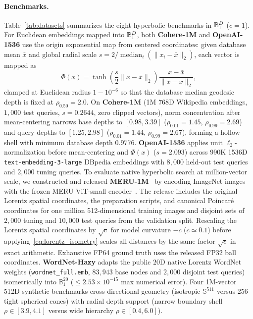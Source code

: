 \paragraph{Benchmarks.}
Table~\ref{tab:datasets} summarizes the eight hyperbolic benchmarks in $\mathbb{B}_1^D$ ($c=1$).
For Euclidean embeddings mapped into $\mathbb{B}_1^D$, both \textbf{Cohere-1M} and \textbf{OpenAI-1536} use the origin exponential map from centered coordinates: given database mean $\bar{x}$ and global radial scale $s = 2 / \operatorname{median}_i(\|x_i - \bar{x}\|_2)$, each vector is mapped as
\[
\Phi(x) = \tanh\!\left(\frac{s}{2}\|x - \bar{x}\|_2\right)\frac{x - \bar{x}}{\|x - \bar{x}\|_2},
\]
clamped at Euclidean radius $1 - 10^{-6}$ so that the database median geodesic depth is fixed at $\rho_{0.50} = 2.0$.
On \textbf{Cohere-1M} (1M 768D Wikipedia embeddings, $1{,}000$ test queries, $s = 0.2644$, zero clipped vectors), norm concentration after mean-centering narrows base depths to $[0.98, 3.39]$ ($\rho_{0.01} = 1.45$, $\rho_{0.99} = 2.69$) and query depths to $[1.25, 2.98]$ ($\rho_{0.01} = 1.44$, $\rho_{0.99} = 2.67$), forming a hollow shell with minimum database depth $0.9776$.
\textbf{OpenAI-1536} applies unit $\ell_2$-normalization before mean-centering and $\Phi(x)$ ($s = 2.093$) across 990K 1536D \texttt{text-embedding-3-large} {DBpedia} embeddings with $8{,}000$ held-out test queries and $2{,}000$ tuning queries.
To evaluate native hyperbolic search at million-vector scale, we constructed and released \textbf{MERU-1M}~\cite{astrmira2026meruimagenet1m} by encoding {ImageNet} images with the frozen {MERU ViT-small} encoder~\cite{desai2023meru}.
The release includes the original Lorentz spatial coordinates, the preparation scripts, and canonical Poincar\'e coordinates for one million 512-dimensional training images and disjoint sets of $2{,}000$ tuning and $10{,}000$ test queries from the validation split. Rescaling the Lorentz spatial coordinates by $\sqrt{c}$ for model curvature $-c$ ($c\simeq0.1$) before applying~\eqref{eq:lorentz_isometry} scales all distances by the same factor $\sqrt{c}$ in exact arithmetic. Exhaustive FP64 ground truth uses the released FP32 ball coordinates.
\textbf{WordNet-Hazy} adapts the public $20$D native {Lorentz} {WordNet} weights (\texttt{wordnet\_full.emb}, $83{,}943$ base nodes and $2{,}000$ disjoint test queries) isometrically into $\mathbb{B}_1^{20}$ ($\le 2.53\times 10^{-15}$ max numerical error).
Four 1M-vector 512D synthetic benchmarks cross directional geometry (isotropic $\mathbb{S}^{511}$ versus $256$ tight spherical cones) with radial depth support (narrow boundary shell $\rho \in [3.9, 4.1]$ versus wide hierarchy $\rho \in [0.4, 6.0]$).

